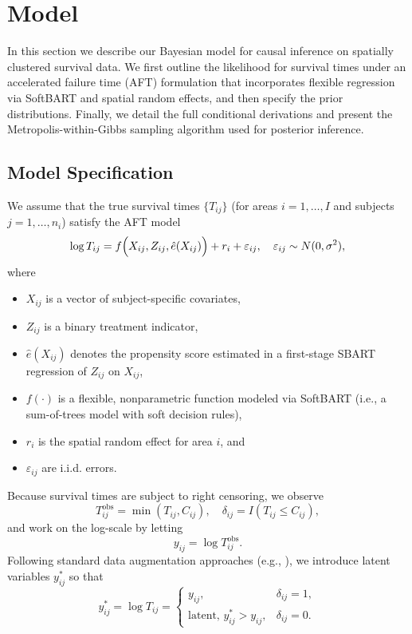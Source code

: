 \documentclass[useAMS,referee]{biom}
\begin{document}
\section{Model}

In this section we describe our Bayesian model for causal inference on spatially clustered survival data. We first outline the likelihood for survival times under an accelerated failure time (AFT) formulation that incorporates flexible regression via SoftBART and spatial random effects, and then specify the prior distributions. Finally, we detail the full conditional derivations and present the Metropolis-within-Gibbs sampling algorithm used for posterior inference.

\subsection{Model Specification}

We assume that the true survival times $\{T_{ij}\}$ (for areas $i=1,\ldots,I$ and subjects $j=1,\ldots,n_i$) satisfy the AFT model
\begin{equation} \label{eq:aft}
\log T_{ij} = f\Bigl(X_{ij}, Z_{ij}, \hat{e}(X_{ij})\Bigr) + r_i + \varepsilon_{ij}, \quad \varepsilon_{ij}\sim N(0,\sigma^2),
\end{equation}
where
\begin{itemize}
    \item $X_{ij}$ is a vector of subject-specific covariates,
    \item $Z_{ij}$ is a binary treatment indicator,
    \item $\hat{e}(X_{ij})$ denotes the propensity score estimated in a first-stage SBART regression of $Z_{ij}$ on $X_{ij}$,
    \item $f(\cdot)$ is a flexible, nonparametric function modeled via SoftBART (i.e., a sum-of-trees model with soft decision rules),
    \item $r_i$ is the spatial random effect for area $i$, and
    \item $\varepsilon_{ij}$ are i.i.d. errors.
\end{itemize}

Because survival times are subject to right censoring, we observe
\[
T_{ij}^{\text{obs}} = \min(T_{ij},C_{ij}), \quad \delta_{ij} = I(T_{ij}\le C_{ij}),
\]
and work on the log-scale by letting
\[
y_{ij} = \log T_{ij}^{\text{obs}}.
\]
Following standard data augmentation approaches (e.g., \cite{tanner1987calculation}), we introduce latent variables $y_{ij}^\ast$ so that
\[
y_{ij}^\ast = \log T_{ij} =
\begin{cases}
y_{ij}, & \delta_{ij}=1, \\
\text{latent, } y_{ij}^\ast > y_{ij}, & \delta_{ij}=0.
\end{cases}
\]
\end{document}
